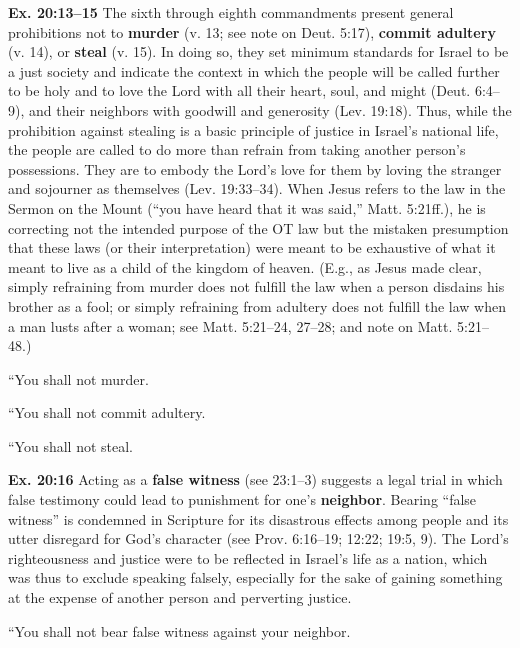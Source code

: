 \documentclass{bible-study-handout}
\begin{document}
\newpage
\begin{studycomment*}\textbf{Ex. 20:13–15} The sixth through eighth commandments present general prohibitions not to \textbf{murder} (v. 13; see note on Deut. 5:17), \textbf{commit adultery} (v. 14), or \textbf{steal} (v. 15). In doing so, they set minimum standards for Israel to be a just society and indicate the context in which the people will be called further to be holy and to love the Lord with all their heart, soul, and might (Deut. 6:4–9), and their neighbors with goodwill and generosity (Lev. 19:18). Thus, while the prohibition against stealing is a basic principle of justice in Israel’s national life, the people are called to do more than refrain from taking another person’s possessions. They are to embody the Lord’s love for them by loving the stranger and sojourner as themselves (Lev. 19:33–34). When Jesus refers to the law in the Sermon on the Mount (“you have heard that it was said,” Matt. 5:21ff.), he is correcting not the intended purpose of the OT law but the mistaken presumption that these laws (or their interpretation) were meant to be exhaustive of what it meant to live as a child of the kingdom of heaven. (E.g., as Jesus made clear, simply refraining from murder does not fulfill the law when a person disdains his brother as a fool; or simply refraining from adultery does not fulfill the law when a man lusts after a woman; see Matt. 5:21–24, 27–28; and note on Matt. 5:21–48.)\end{studycomment*}

“You shall not murder.

“You shall not commit adultery.

“You shall not steal.

\begin{studycomment}\textbf{Ex. 20:16} Acting as a \textbf{false witness} (see 23:1–3) suggests a legal trial in which false testimony could lead to punishment for one’s \textbf{neighbor}. Bearing “false witness” is condemned in Scripture for its disastrous effects among people and its utter disregard for God’s character (see Prov. 6:16–19; 12:22; 19:5, 9). The Lord’s righteousness and justice were to be reflected in Israel’s life as a nation, which was thus to exclude speaking falsely, especially for the sake of gaining something at the expense of another person and perverting justice.\end{studycomment}“You shall not bear false witness against your neighbor.
\end{document}
